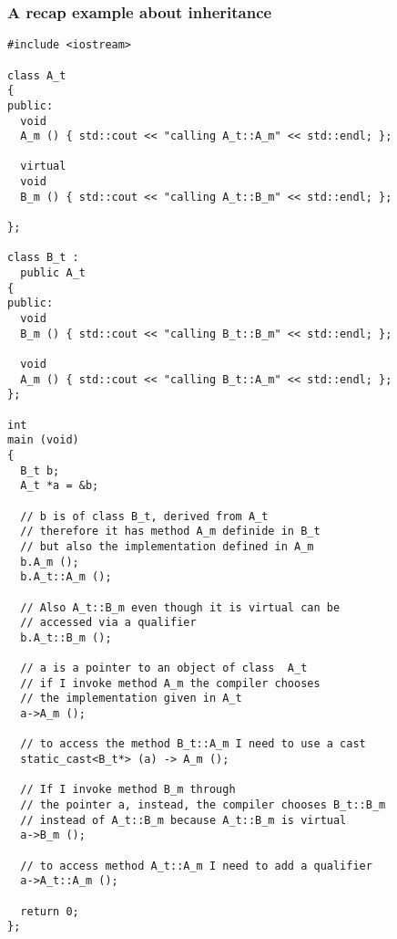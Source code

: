 \documentclass[smaller,a4paper]{beamer}
\begin{document}
\begin{frame}
\frametitle{A recap example about inheritance}
\begin{lstlisting}
#include <iostream>

class A_t
{
public:
  void 
  A_m () { std::cout << "calling A_t::A_m" << std::endl; };
  
  virtual 
  void 
  B_m () { std::cout << "calling A_t::B_m" << std::endl; };

};

class B_t :
  public A_t
{
public:
  void 
  B_m () { std::cout << "calling B_t::B_m" << std::endl; };

  void 
  A_m () { std::cout << "calling B_t::A_m" << std::endl; };
};

int 
main (void)
{
  B_t b;
  A_t *a = &b;

  // b is of class B_t, derived from A_t 
  // therefore it has method A_m definide in B_t
  // but also the implementation defined in A_m
  b.A_m ();
  b.A_t::A_m ();

  // Also A_t::B_m even though it is virtual can be
  // accessed via a qualifier
  b.A_t::B_m ();

  // a is a pointer to an object of class  A_t
  // if I invoke method A_m the compiler chooses
  // the implementation given in A_t
  a->A_m ();

  // to access the method B_t::A_m I need to use a cast
  static_cast<B_t*> (a) -> A_m ();

  // If I invoke method B_m through
  // the pointer a, instead, the compiler chooses B_t::B_m
  // instead of A_t::B_m because A_t::B_m is virtual
  a->B_m ();

  // to access method A_t::A_m I need to add a qualifier
  a->A_t::A_m ();

  return 0;
};
\end{lstlisting}

\end{frame}
\end{document}
